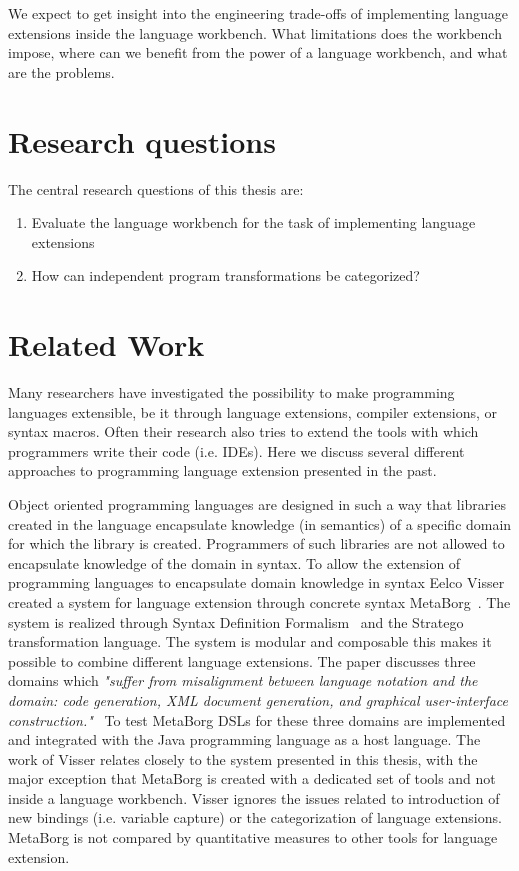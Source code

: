 We expect to get insight into the engineering trade-offs of implementing language extensions inside the language workbench. What limitations does the workbench impose, where can we benefit from the power of a language workbench, and what are the problems.

\section{Research questions}
The central research questions of this thesis are:

\begin{enumerate}
	\item Evaluate the language workbench for the task of implementing language extensions
	\item How can independent program transformations be categorized?	
\end{enumerate}

\section{Related Work} \label{sec:related}
Many researchers have investigated the possibility to make programming languages extensible, be it through language extensions, compiler extensions, or syntax macros. Often their research also tries to extend the tools with which programmers write their code (i.e. IDEs). Here we discuss several different approaches to programming language extension presented in the past.

Object oriented programming languages are designed in such a way that libraries created in the language encapsulate knowledge (in semantics) of a specific domain for which the library is created. Programmers of such libraries are not allowed to encapsulate knowledge of the domain in syntax. To allow the extension of programming languages to encapsulate domain knowledge in syntax Eelco Visser created a system for language extension through concrete syntax MetaBorg~\cite{Visser20024}. The system is realized through Syntax Definition Formalism~\cite{Heering1989} and the Stratego~\cite{Visser2001a} transformation language. The system is modular and composable this makes it possible to combine different language extensions. The paper discusses three domains which \textit{"suffer from misalignment between language notation and the domain: code generation, XML document generation, and graphical user-interface construction."}~\cite{Visser20024} To test MetaBorg DSLs for these three domains are implemented and integrated with the Java programming language as a host language. The work of Visser relates closely to the system presented in this thesis, with the major exception that MetaBorg is created with a dedicated set of tools and not inside a language workbench. Visser ignores the issues related to introduction of new bindings (i.e. variable capture) or the categorization of language extensions. MetaBorg is not compared by quantitative measures to other tools for language extension.

